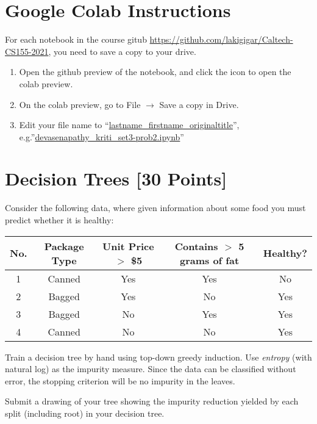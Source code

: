 \section*{Google Colab Instructions}

For each notebook in the course gitub \url{https://github.com/lakigigar/Caltech-CS155-2021}, you need to save a copy to your drive.

\begin{enumerate}
	\item Open the github preview of the notebook, and click the icon to open the colab preview.
	\item On the colab preview, go to File $\rightarrow$ Save a copy in Drive.
	\item Edit your file name to “\url{lastname_firstname_originaltitle}”, e.g.”\url{devasenapathy_kriti_set3-prob2.ipynb}”
\end{enumerate}


\newpage
\section{Decision Trees [30 Points]}

\problem[7]
Consider the following data, where given information about some food you must predict whether it is healthy:

\begin{table}[ht]
\centering
\begin{tabular}{c | c c c | c}
\hline
No. & Package Type & Unit Price $>$ \$5 & Contains $>$ 5 grams of fat & Healthy? \\ [0.5ex]
\hline
1 & Canned & Yes & Yes & No  \\
2 & Bagged & Yes & No  & Yes \\
3 & Bagged & No  & Yes & Yes \\
4 & Canned & No  & No  & Yes \\ [1ex]
\hline
\end{tabular}
\end{table}

Train a decision tree by hand using top-down greedy induction. Use \emph{entropy} (with natural log) as the impurity measure.  Since the data can be classified
without error, the stopping criterion will be no impurity in the leaves.

Submit a drawing of your tree showing the impurity reduction yielded by each split (including root) in your decision tree.


